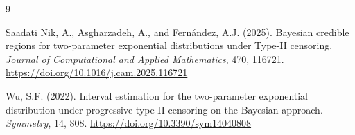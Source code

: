 \documentclass[twoside]{article}
\begin{document}
\begin{thebibliography}{9}
	
	Saadati Nik, A., Asgharzadeh, A., and Fern\'{a}ndez, A.J. (2025).
	Bayesian credible regions for two-parameter exponential distributions under Type-II censoring.
	\textit{Journal of Computational and Applied Mathematics}, 470, 116721.
	\url{https://doi.org/10.1016/j.cam.2025.116721}
	
	Wu, S.F. (2022).
	Interval estimation for the two-parameter exponential distribution under progressive type-II censoring on the Bayesian approach.
	\textit{Symmetry}, 14, 808.
	\url{https://doi.org/10.3390/sym14040808}
	
\end{thebibliography}



 
\end{document}
